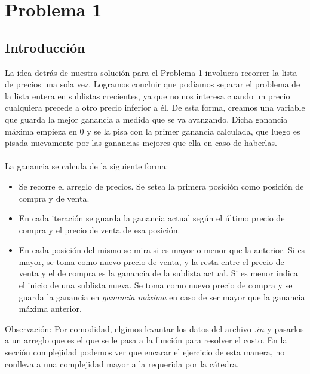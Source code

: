 \section{Problema 1}

\subsection{Introducción}

La idea detrás de nuestra solución para el Problema 1 involucra recorrer la lista de precios una sola vez. Logramos concluir que podíamos separar el problema de la lista entera en sublistas crecientes, ya que no nos interesa cuando un precio cualquiera precede a otro precio inferior a él. De esta forma, creamos una variable que guarda la mejor ganancia a medida que se va avanzando. Dicha ganancia máxima empieza en 0 y se la pisa con la primer ganancia calculada, que luego es pisada nuevamente por las ganancias mejores que ella en caso de haberlas.\\
\\
\indent La ganancia se calcula de la siguiente forma:
\begin{itemize}
	\item Se recorre el arreglo de precios. Se setea la primera posición como posición de compra y de venta.
	\item En cada iteración se guarda la ganancia actual según el último precio de compra y el precio de venta de esa posición.
	\item En cada posición del mismo se mira si es mayor o menor que la anterior. Si es mayor, se toma como nuevo precio de venta, y la resta entre el precio de venta y el de compra es la ganancia de la sublista actual. Si es menor indica el inicio de una sublista nueva. Se toma como nuevo precio de compra y se guarda la ganancia en \textit{ganancia máxima} en caso de ser mayor que la ganancia máxima anterior.
\end{itemize}

\indent Observación: Por comodidad, elgimos levantar los datos del archivo $.in$ y pasarlos a un arreglo que es el que se le pasa a la función para resolver el costo. En la sección complejidad podemos ver que encarar el ejercicio de esta manera, no conlleva a una complejidad mayor a la requerida por la cátedra.\\


